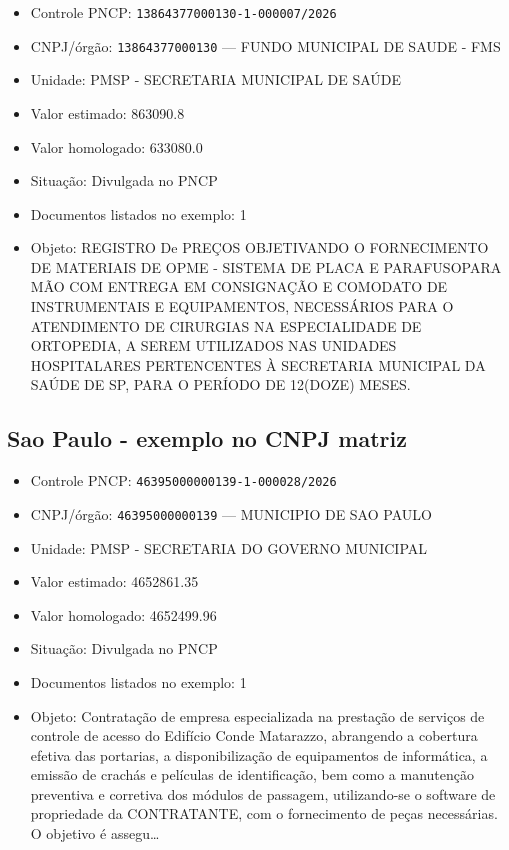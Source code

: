 \documentclass[12pt]{article}
\providecommand{\tightlist}{%
  \setlength{\itemsep}{0pt}\setlength{\parskip}{0pt}}
\begin{document}
\begin{itemize}
\tightlist
\item
  Controle PNCP: \texttt{13864377000130-1-000007/2026}
\item
  CNPJ/órgão: \texttt{13864377000130} --- FUNDO MUNICIPAL DE SAUDE - FMS
\item
  Unidade: PMSP - SECRETARIA MUNICIPAL DE SAÚDE
\item
  Valor estimado: 863090.8
\item
  Valor homologado: 633080.0
\item
  Situação: Divulgada no PNCP
\item
  Documentos listados no exemplo: 1
\item
  Objeto: REGISTRO De PREÇOS OBJETIVANDO O FORNECIMENTO DE MATERIAIS DE
  OPME - SISTEMA DE PLACA E PARAFUSOPARA MÃO COM ENTREGA EM CONSIGNAÇÃO
  E COMODATO DE INSTRUMENTAIS E EQUIPAMENTOS, NECESSÁRIOS PARA O
  ATENDIMENTO DE CIRURGIAS NA ESPECIALIDADE DE ORTOPEDIA, A SEREM
  UTILIZADOS NAS UNIDADES HOSPITALARES PERTENCENTES À SECRETARIA
  MUNICIPAL DA SAÚDE DE SP, PARA O PERÍODO DE 12(DOZE) MESES.
\end{itemize}

\subsection{Sao Paulo - exemplo no CNPJ
matriz}\label{sao-paulo---exemplo-no-cnpj-matriz}

\begin{itemize}
\tightlist
\item
  Controle PNCP: \texttt{46395000000139-1-000028/2026}
\item
  CNPJ/órgão: \texttt{46395000000139} --- MUNICIPIO DE SAO PAULO
\item
  Unidade: PMSP - SECRETARIA DO GOVERNO MUNICIPAL
\item
  Valor estimado: 4652861.35
\item
  Valor homologado: 4652499.96
\item
  Situação: Divulgada no PNCP
\item
  Documentos listados no exemplo: 1
\item
  Objeto: Contratação de empresa especializada na prestação de serviços
  de controle de acesso do Edifício Conde Matarazzo, abrangendo a
  cobertura efetiva das portarias, a disponibilização de equipamentos de
  informática, a emissão de crachás e películas de identificação, bem
  como a manutenção preventiva e corretiva dos módulos de passagem,
  utilizando-se o software de propriedade da CONTRATANTE, com o
  fornecimento de peças necessárias. O objetivo é assegu\ldots{}
\end{itemize}
\end{document}
